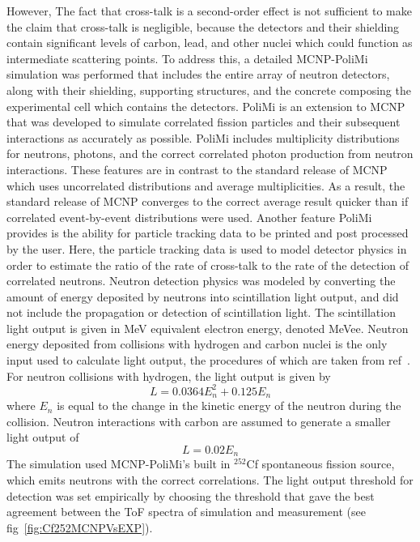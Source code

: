 However, The fact that cross-talk is a second-order effect is not sufficient to make the claim that cross-talk is negligible,
because the detectors and their shielding contain significant levels of carbon, lead, and other nuclei which could function as intermediate scattering points.
To address this, a detailed MCNP-PoliMi simulation was performed that includes the entire array of neutron detectors, along with their shielding, supporting structures, and the concrete composing the experimental cell which contains the detectors.
PoliMi is an extension to MCNP that was developed to simulate correlated fission particles and their subsequent interactions as accurately as possible.
PoliMi includes multiplicity distributions for neutrons, photons, and the correct correlated photon production from neutron interactions.
These features are in contrast to the standard release of MCNP which uses uncorrelated distributions and average multiplicities.
As a result, the standard release of MCNP converges to the correct average result quicker than if correlated event-by-event distributions were used.
Another feature PoliMi provides is the ability for particle tracking data to be printed and post processed by the user.
Here, the particle tracking data is used to model detector physics in order to estimate the ratio of the rate of cross-talk to the rate of the detection of correlated neutrons.
Neutron detection physics was modeled by converting the amount of energy deposited by neutrons into scintillation light output, and did not include the propagation or detection of scintillation light.
The scintillation light output is given in MeV equivalent electron energy, denoted MeVee.
Neutron energy deposited from collisions with hydrogen and carbon nuclei is the only input used to calculate light output, the procedures of which are taken from ref~\cite{POLIMI}.
For neutron collisions with hydrogen, the light output is given by
\begin{displaymath}
L = 0.0364 E_n^2 +  0.125 E_n
\end{displaymath}
where $E_n$ is equal to the change in the kinetic energy of the neutron during the collision.
Neutron interactions with carbon are assumed to generate a smaller light output of
\begin{displaymath}
L = 0.02 E_n
\end{displaymath}
The simulation used MCNP-PoliMi's built in $^{252}$Cf spontaneous fission source, which emits neutrons with the correct correlations.
The light output threshold for detection was set empirically by choosing the threshold that gave the best agreement between the ToF spectra of simulation and measurement (see fig~\ref{fig:Cf252MCNPVsEXP}).
